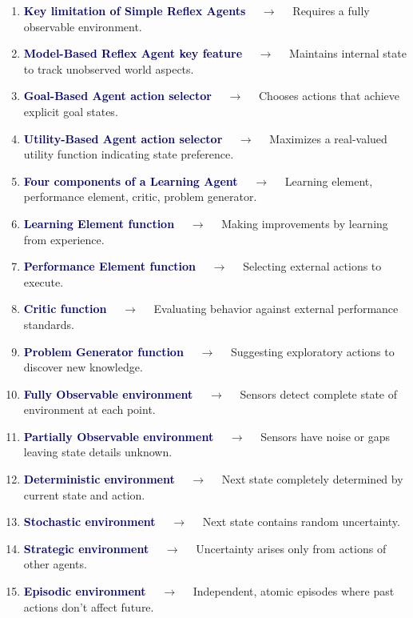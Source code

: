 \documentclass[11pt,a4paper]{article}
\begin{document}
\begin{enumerate}[label=\arabic*., leftmargin=*, labelsep=0.8em, itemsep=0.35em, parsep=0.1em, topsep=0.2em]
  \item \textcolor{darkblue}{\textbf{Key limitation of Simple Reflex Agents}} $\quad\to\quad$ Requires a fully observable environment.
  \item \textcolor{darkblue}{\textbf{Model-Based Reflex Agent key feature}} $\quad\to\quad$ Maintains internal state to track unobserved world aspects.
  \item \textcolor{darkblue}{\textbf{Goal-Based Agent action selector}} $\quad\to\quad$ Chooses actions that achieve explicit goal states.
  \item \textcolor{darkblue}{\textbf{Utility-Based Agent action selector}} $\quad\to\quad$ Maximizes a real-valued utility function indicating state preference.
  \item \textcolor{darkblue}{\textbf{Four components of a Learning Agent}} $\quad\to\quad$ Learning element, performance element, critic, problem generator.
  \item \textcolor{darkblue}{\textbf{Learning Element function}} $\quad\to\quad$ Making improvements by learning from experience.
  \item \textcolor{darkblue}{\textbf{Performance Element function}} $\quad\to\quad$ Selecting external actions to execute.
  \item \textcolor{darkblue}{\textbf{Critic function}} $\quad\to\quad$ Evaluating behavior against external performance standards.
  \item \textcolor{darkblue}{\textbf{Problem Generator function}} $\quad\to\quad$ Suggesting exploratory actions to discover new knowledge.
  \item \textcolor{darkblue}{\textbf{Fully Observable environment}} $\quad\to\quad$ Sensors detect complete state of environment at each point.
  \item \textcolor{darkblue}{\textbf{Partially Observable environment}} $\quad\to\quad$ Sensors have noise or gaps leaving state details unknown.
  \item \textcolor{darkblue}{\textbf{Deterministic environment}} $\quad\to\quad$ Next state completely determined by current state and action.
  \item \textcolor{darkblue}{\textbf{Stochastic environment}} $\quad\to\quad$ Next state contains random uncertainty.
  \item \textcolor{darkblue}{\textbf{Strategic environment}} $\quad\to\quad$ Uncertainty arises only from actions of other agents.
  \item \textcolor{darkblue}{\textbf{Episodic environment}} $\quad\to\quad$ Independent, atomic episodes where past actions don't affect future.

\end{enumerate}
\end{document}
